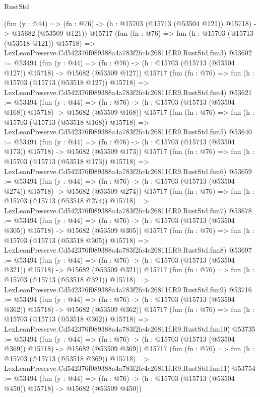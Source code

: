 \begin{lexlean}{RustStd}
\begin{coremodule}
    (fun (y : @44) =>
    (fn : @76) -> (h : @15703 (@15713 (@53504 @121)) @15718) -> @15682 (@53509 @121))
    @15717
    (fun (fn : @76) =>
    fun (h : @15703 (@15713 (@53518 @121)) @15718) =>
    LexLeanPreserve.Cd542376f089388a4a783f2fc4c26811f.R9.RustStd.fun3)
@53602 := @53494
    (fun (y : @44) =>
    (fn : @76) -> (h : @15703 (@15713 (@53504 @127)) @15718) -> @15682 (@53509 @127))
    @15717
    (fun (fn : @76) =>
    fun (h : @15703 (@15713 (@53518 @127)) @15718) =>
    LexLeanPreserve.Cd542376f089388a4a783f2fc4c26811f.R9.RustStd.fun4)
@53621 := @53494
    (fun (y : @44) =>
    (fn : @76) -> (h : @15703 (@15713 (@53504 @168)) @15718) -> @15682 (@53509 @168))
    @15717
    (fun (fn : @76) =>
    fun (h : @15703 (@15713 (@53518 @168)) @15718) =>
    LexLeanPreserve.Cd542376f089388a4a783f2fc4c26811f.R9.RustStd.fun5)
@53640 := @53494
    (fun (y : @44) =>
    (fn : @76) -> (h : @15703 (@15713 (@53504 @173)) @15718) -> @15682 (@53509 @173))
    @15717
    (fun (fn : @76) =>
    fun (h : @15703 (@15713 (@53518 @173)) @15718) =>
    LexLeanPreserve.Cd542376f089388a4a783f2fc4c26811f.R9.RustStd.fun6)
@53659 := @53494
    (fun (y : @44) =>
    (fn : @76) -> (h : @15703 (@15713 (@53504 @274)) @15718) -> @15682 (@53509 @274))
    @15717
    (fun (fn : @76) =>
    fun (h : @15703 (@15713 (@53518 @274)) @15718) =>
    LexLeanPreserve.Cd542376f089388a4a783f2fc4c26811f.R9.RustStd.fun7)
@53678 := @53494
    (fun (y : @44) =>
    (fn : @76) -> (h : @15703 (@15713 (@53504 @305)) @15718) -> @15682 (@53509 @305))
    @15717
    (fun (fn : @76) =>
    fun (h : @15703 (@15713 (@53518 @305)) @15718) =>
    LexLeanPreserve.Cd542376f089388a4a783f2fc4c26811f.R9.RustStd.fun8)
@53697 := @53494
    (fun (y : @44) =>
    (fn : @76) -> (h : @15703 (@15713 (@53504 @321)) @15718) -> @15682 (@53509 @321))
    @15717
    (fun (fn : @76) =>
    fun (h : @15703 (@15713 (@53518 @321)) @15718) =>
    LexLeanPreserve.Cd542376f089388a4a783f2fc4c26811f.R9.RustStd.fun9)
@53716 := @53494
    (fun (y : @44) =>
    (fn : @76) -> (h : @15703 (@15713 (@53504 @362)) @15718) -> @15682 (@53509 @362))
    @15717
    (fun (fn : @76) =>
    fun (h : @15703 (@15713 (@53518 @362)) @15718) =>
    LexLeanPreserve.Cd542376f089388a4a783f2fc4c26811f.R9.RustStd.fun10)
@53735 := @53494
    (fun (y : @44) =>
    (fn : @76) -> (h : @15703 (@15713 (@53504 @369)) @15718) -> @15682 (@53509 @369))
    @15717
    (fun (fn : @76) =>
    fun (h : @15703 (@15713 (@53518 @369)) @15718) =>
    LexLeanPreserve.Cd542376f089388a4a783f2fc4c26811f.R9.RustStd.fun11)
@53754 := @53494
    (fun (y : @44) =>
    (fn : @76) -> (h : @15703 (@15713 (@53504 @450)) @15718) -> @15682 (@53509 @450))

\end{coremodule}
\end{lexlean}
